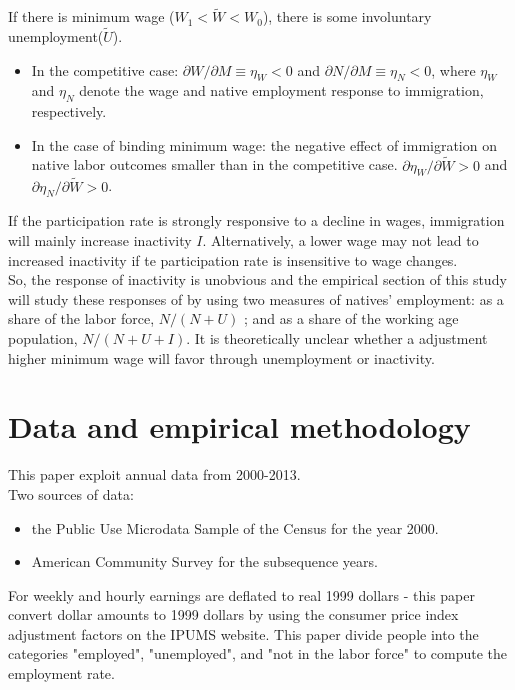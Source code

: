 \documentclass[../root]{subfiles}
\begin{document}
    If there is minimum wage ($W_1 < \tilde{W} < W_0$), there is some involuntary unemployment($\tilde{U}$).

    \begin{itemize}
        \item In the competitive case: $\partial W/ \partial M \equiv \eta_W <0$ and $\partial N / \partial M \equiv \eta_N <0$, where $\eta_W$ and $\eta_N$ denote the wage and native employment response to immigration, respectively.
        \item In the case of binding minimum wage: the negative effect of immigration on native labor outcomes smaller than in the competitive case.  $ \partial \eta_W/ \partial \tilde{W} >0$ and $\partial \eta_N / \partial \tilde{W} >0$.
    \end{itemize}

    If the participation rate is strongly responsive to a decline in wages, immigration will mainly increase inactivity $I$.
    Alternatively, a lower wage may not lead to increased inactivity if te participation rate is insensitive to wage changes. \\
    So, the response of inactivity is unobvious and the empirical section of this study will study these responses of by using two measures of natives' employment: as a share of the labor force, $N/(N+U)$ ; and as a share of the working age population, $N/(N+U+I)$.
    It is theoretically unclear whether a adjustment higher minimum wage will favor through unemployment or inactivity.
    

    \section{Data and empirical methodology}
    This paper exploit annual data from 2000-2013. \\
    Two sources of data:
    \begin{itemize}
        \item the Public Use Microdata Sample of the Census for the year 2000.
        \item American Community Survey for the subsequence years.
    \end{itemize}

    For weekly and hourly earnings are deflated to real 1999 dollars - this paper convert dollar amounts to 1999 dollars by using the consumer price index adjustment factors on the IPUMS website.
    This paper  divide people into the categories "employed", "unemployed", and "not in the labor force" to compute the employment rate.
\end{document}
